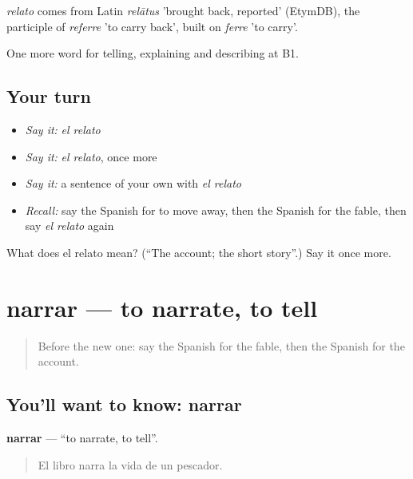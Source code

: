 \begin{cousinweb}
\emph{relato} comes from Latin \emph{relātus} 'brought back, reported' (EtymDB), the participle of \emph{referre} 'to carry back', built on \emph{ferre} 'to carry'.
\end{cousinweb}

\begin{grammarlens}[title={What you've built}]
One more word for telling, explaining and describing at B1.
\end{grammarlens}

\subsection*{Your turn}
\begin{itemize}
\raggedright
  \item \emph{Say it:} \emph{el relato}
  \item \emph{Say it:} \emph{el relato}, once more
  \item \emph{Say it:} a sentence of your own with \emph{el relato}
  \item \emph{Recall:} say the Spanish for to move away, then the Spanish for the fable, then say \emph{el relato} again
\end{itemize}

\begin{tcolorbox}[breakable,colback=teal!4,colframe=teal!35!black,title={Before you move on}]
What does el relato mean? (\textquotedblleft{}The account; the short story\textquotedblright{}.) Say it once more.
\end{tcolorbox}
\section[narrar]{narrar — to narrate, to tell}

\label{lesson:ES-C563-narrar}



\begin{quote}
Before the new one: say the Spanish for the fable, then the Spanish for the account.
\end{quote}

\subsection*{You'll want to know: narrar}
\textbf{narrar} — \textquotedblleft{}to narrate, to tell\textquotedblright{}.

\begin{quote}
El libro narra la vida de un pescador.
\end{quote}

